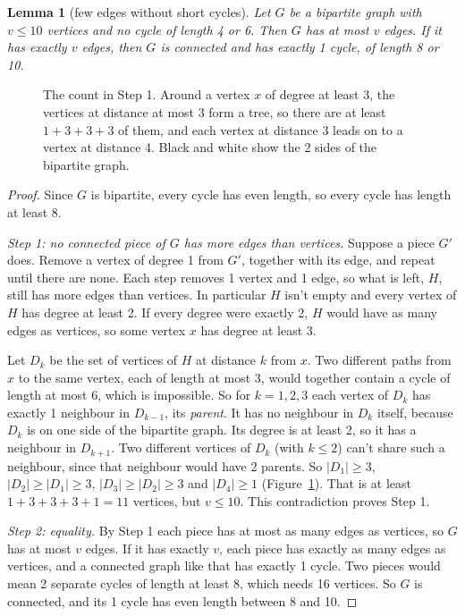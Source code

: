 \documentclass[11pt]{article}
\newtheorem{lemma}[theorem]{Lemma}
\theoremstyle{definition}
\theoremstyle{remark}
\begin{document}
\begin{lemma}[few edges without short cycles]\label{lem:tenvertices}
Let $G$ be a bipartite graph with $v\le10$ vertices and no cycle of length 4 or 6. Then $G$ has
at most $v$ edges. If it has exactly $v$ edges, then $G$ is connected and has exactly 1 cycle, of
length 8 or 10.
\end{lemma}

\begin{figure}[htbp]
\centering

\caption{The count in Step 1. Around a vertex $x$ of degree at least 3, the vertices at distance
at most 3 form a tree, so there are at least $1+3+3+3$ of them, and each vertex at distance 3
leads on to a vertex at distance 4. Black and white show the 2 sides of the bipartite graph.}
\label{fig:bfs}
\end{figure}

\begin{proof}
Since $G$ is bipartite, every cycle has even length, so every cycle has length at least 8.

\emph{Step 1: no connected piece of $G$ has more edges than vertices.} Suppose a piece $G'$ does.
Remove a vertex of degree 1 from $G'$, together with its edge, and repeat until there are none.
Each step removes 1 vertex and 1 edge, so what is left, $H$, still has more edges than vertices.
In particular $H$ isn't empty and every vertex of $H$ has degree at least 2. If every degree
were exactly 2, $H$ would have as many edges as vertices, so some vertex $x$ has degree at least
3.

Let $D_k$ be the set of vertices of $H$ at distance $k$ from $x$. Two different paths from $x$ to
the same vertex, each of length at most 3, would together contain a cycle of length at most 6,
which is impossible. So for $k=1,2,3$ each vertex of $D_k$ has exactly 1 neighbour in $D_{k-1}$,
its \emph{parent}. It has no neighbour in $D_k$ itself, because $D_k$ is on one side of the
bipartite graph. Its degree is at least 2, so it has a neighbour in $D_{k+1}$. Two different
vertices of $D_k$ (with $k\le2$) can't share such a neighbour, since that neighbour would have 2
parents. So $|D_1|\ge3$, $|D_2|\ge|D_1|\ge3$, $|D_3|\ge|D_2|\ge3$ and $|D_4|\ge1$
(Figure~\ref{fig:bfs}). That is at least $1+3+3+3+1=11$ vertices, but $v\le10$. This
contradiction proves Step 1.

\emph{Step 2: equality.} By Step 1 each piece has at most as many edges as vertices, so $G$ has
at most $v$ edges. If it has exactly $v$, each piece has exactly as many edges as vertices, and a
connected graph like that has exactly 1 cycle. Two pieces would mean 2 separate cycles of length
at least 8, which needs 16 vertices. So $G$ is connected, and its 1 cycle has even length between
8 and 10.
\end{proof}
\end{document}
